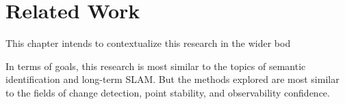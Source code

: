 \section{Related Work}
\label{sec:related_work}

This chapter intends to contextualize this research in the wider bod

In terms of goals, this research is most similar to the topics of semantic identification and long-term SLAM. But the methods explored are most similar to the fields of change detection, point stability, and observability confidence.

% 